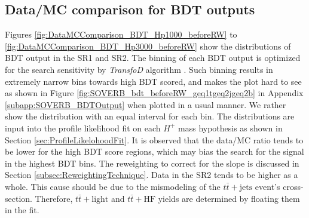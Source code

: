 \subsection{Data/MC comparison for BDT outputs}
\label{subsec:DataAndMCComparisonOfBDT}
Figures \ref{fig:DataMCComparison_BDT_Hp1000_beforeRW} to \ref{fig:DataMCComparison_BDT_Hp3000_beforeRW} show the distributions of BDT output in the SR1 and SR2. The binning of each BDT output is optimized for the search sensitivity by \textit{TransfoD} algorithm \cite{Binning-TTHFilter}. Such binning results in extremely narrow bins towards high BDT scored, and makes the plot hard to see as shown in Figure \ref{fig:SOVERB_bdt_beforeRW_geq1tgeq2jgeq2b} in Appendix \ref{subapp:SOVERB_BDTOutput} when plotted in a usual manner. We rather show the distribution with an equal interval for each bin. The distributions are input into the profile likelihood fit on each $H^{+}$ mass hypothesis as shown in Section \ref{sec:ProfileLikelohoodFit}. It is observed that the data/MC ratio tends to be lower for the high BDT score regions, which may bias the search for the signal in the highest BDT bins. The reweighting to correct for the slope is discussed in Section \ref{subsec:ReweightingTechnique}. Data in the SR2 tends to be higher as a whole. This cause should be due to the mismodeling of the $t\bar{t}+\text{jets}$ event's cross-section. Therefore, $t\bar{t}+\text{light}$ and $t\bar{t}+\text{HF}$ yields are determined by floating them in the fit.

